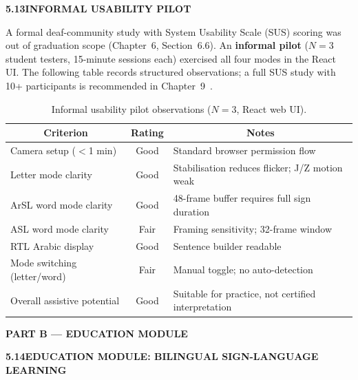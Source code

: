 \noindent\textbf{5.13\quad INFORMAL USABILITY PILOT}\par
{}
\vspace{0.2cm}

\noindent A formal deaf-community study with System Usability Scale (SUS) scoring was out of graduation scope (Chapter~6, Section~6.6). An \textbf{informal pilot} ($N{=}3$ student testers, 15-minute sessions each) exercised all four modes in the React UI. The following table records structured observations; a full SUS study with 10+ participants is recommended in Chapter~9~\cite{wcag22}.\par\vspace{0.2cm}

\begin{table}[H]
\centering
\caption{Informal usability pilot observations ($N{=}3$, React web UI).}
\label{tab:ch7-usability}
\small
\begin{tabular}{|l|c|l|}
\hline
\multicolumn{1}{|c|}{\textbf{Criterion}} & \multicolumn{1}{|c|}{\textbf{Rating}} & \multicolumn{1}{|c|}{\textbf{Notes}}\\
\hline
Camera setup ($<$1 min) & Good & Standard browser permission flow \\
\hline
Letter mode clarity & Good & Stabilisation reduces flicker; J/Z motion weak \\
\hline
ArSL word mode clarity & Good & 48-frame buffer requires full sign duration \\
\hline
ASL word mode clarity & Fair & Framing sensitivity; 32-frame window \\
\hline
RTL Arabic display & Good & Sentence builder readable \\
\hline
Mode switching (letter/word) & Fair & Manual toggle; no auto-detection \\
\hline
Overall assistive potential & Good & Suitable for practice, not certified interpretation \\
\hline
\end{tabular}
\end{table}
\vspace{0.2cm}

\clearpage
\begin{center}{\large \textbf{PART B --- EDUCATION MODULE}}\end{center}
\vspace{0.1cm}

\noindent\textbf{5.14\quad EDUCATION MODULE: BILINGUAL SIGN-LANGUAGE LEARNING}\par
{}
\vspace{0.2cm}


